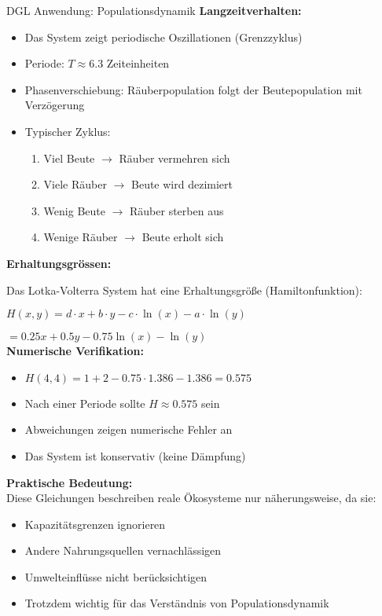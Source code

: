 \begin{example2}{DGL Anwendung: Populationsdynamik}
\textbf{Langzeitverhalten:}
\begin{itemize}
    \item Das System zeigt periodische Oszillationen (Grenzzyklus)
    \item Periode: $T \approx 6.3$ Zeiteinheiten
    \item Phasenverschiebung: Räuberpopulation folgt der Beutepopulation mit Verzögerung
    \item Typischer Zyklus:
    \begin{enumerate}
        \item Viel Beute $\rightarrow$ Räuber vermehren sich
        \item Viele Räuber $\rightarrow$ Beute wird dezimiert  
        \item Wenig Beute $\rightarrow$ Räuber sterben aus
        \item Wenige Räuber $\rightarrow$ Beute erholt sich
    \end{enumerate}
\end{itemize}
\vspace{1mm}
\textbf{Erhaltungsgrössen:}

Das Lotka-Volterra System hat eine Erhaltungsgröße (Hamiltonfunktion):

$H(x,y) = d \cdot x + b \cdot y - c \cdot \ln(x) - a \cdot \ln(y)$

$= 0.25x + 0.5y - 0.75\ln(x) - \ln(y)$
\vspace{1mm}\\
\textbf{Numerische Verifikation:}
\begin{itemize}
    \item $H(4,4) = 1 + 2 - 0.75 \cdot 1.386 - 1.386 = 0.575$
    \item Nach einer Periode sollte $H \approx 0.575$ sein
    \item Abweichungen zeigen numerische Fehler an
    \item Das System ist konservativ (keine Dämpfung)
\end{itemize}

\textbf{Praktische Bedeutung:}\\
Diese Gleichungen beschreiben reale Ökosysteme nur näherungsweise, da sie:
\begin{itemize}
    \item Kapazitätsgrenzen ignorieren
    \item Andere Nahrungsquellen vernachlässigen
    \item Umwelteinflüsse nicht berücksichtigen
    \item Trotzdem wichtig für das Verständnis von Populationsdynamik
\end{itemize}
\end{example2}